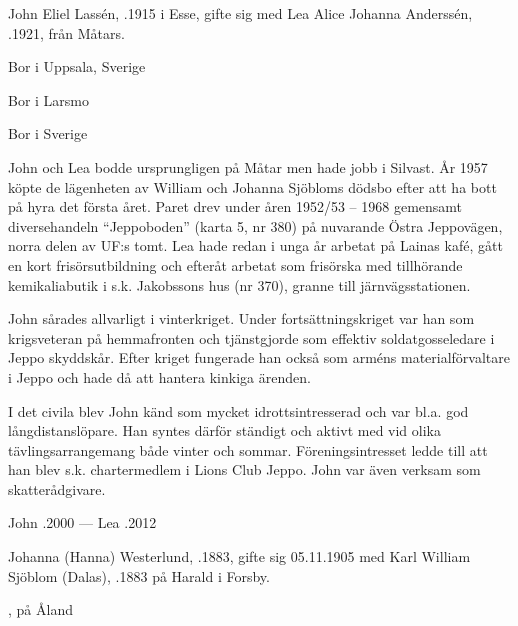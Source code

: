 John Eliel Lassén, .1915 i Esse, gifte sig med Lea Alice Johanna Anderssén, .1921, från Måtars.
\begin{jhchildren}
  \item {} Bor i Uppsala, Sverige
  \item {} Bor i Larsmo
  \item {}
  \item {} Bor i Sverige
  \item {}
\end{jhchildren}

John och Lea bodde ursprungligen på Måtar men hade jobb i Silvast. År 1957 köpte de lägenheten av William och Johanna Sjöbloms dödsbo efter att ha bott på hyra det första året. Paret drev under åren 1952/53 -- 1968 gemensamt diversehandeln ``Jeppoboden'' (karta 5, nr 380) på nuvarande Östra Jeppovägen, norra delen av UF:s tomt. Lea hade redan i unga år arbetat på Lainas kafé, gått en kort frisörsutbildning och efteråt arbetat som frisörska med tillhörande kemikaliabutik i s.k. Jakobssons hus (nr 370), granne till järnvägsstationen.

John sårades allvarligt i vinterkriget. Under fortsättningskriget var han som krigsveteran på hemmafronten och tjänstgjorde som effektiv soldatgosseledare i Jeppo skyddskår. Efter kriget fungerade han också som arméns materialförvaltare i Jeppo och hade då att hantera kinkiga ärenden.

I det civila blev John känd som mycket idrottsintresserad och var bl.a. god långdistanslöpare. Han syntes därför ständigt och aktivt med vid olika tävlingsarrangemang både vinter och sommar. Föreningsintresset ledde till att han blev s.k. chartermedlem i Lions Club Jeppo. John var även verksam som skatterådgivare.

John .2000  ---  Lea .2012


\jhvspace{}


Johanna (Hanna) Westerlund, .1883, gifte sig 05.11.1905 med Karl William Sjöblom (Dalas), .1883 på Harald i Forsby.
\begin{jhchildren}
  \item {}
  \item {}
  \item {}
  \item {}, på Åland
  \item {}
\end{jhchildren}

